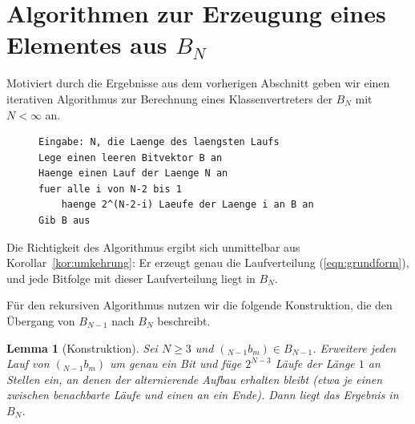 \documentclass[11pt,a4paper]{scrartcl}
\theoremstyle{plain}
\newtheorem{lemma}[satz]{Lemma}
\theoremstyle{definition}
\theoremstyle{remark}
\begin{document}
\section{Algorithmen zur Erzeugung eines Elementes aus
\texorpdfstring{$B_N$}{B\_N}}\label{sec:algorithmen}

\noindent Motiviert durch die Ergebnisse aus dem vorherigen Abschnitt
geben wir einen iterativen Algorithmus zur Berechnung eines
Klassenvertreters der $B_N$ mit $N<\infty$ an.

\begin{figure}[htbp]
\begin{lstlisting}[caption={Iterative Erzeugung einer Folge aus B\_N fuer ein beliebiges N},label={algo:iterativ}]
Eingabe: N, die Laenge des laengsten Laufs
Lege einen leeren Bitvektor B an
Haenge einen Lauf der Laenge N an
fuer alle i von N-2 bis 1
    haenge 2^(N-2-i) Laeufe der Laenge i an B an
Gib B aus
\end{lstlisting}
\end{figure}

\noindent Die Richtigkeit des Algorithmus ergibt sich unmittelbar aus
Korollar~\ref{kor:umkehrung}: Er erzeugt genau die Laufverteilung
(\ref{eqn:grundform}), und jede Bitfolge mit dieser Laufverteilung
liegt in $B_N$.

\noindent Für den rekursiven Algorithmus nutzen wir die folgende
Konstruktion, die den Übergang von $B_{N-1}$ nach $B_N$ beschreibt.

\begin{lemma}[Konstruktion]\label{lem:konstruktion}
Sei $N\geq 3$ und $({}_{N-1}b_m)\in B_{N-1}$. Erweitere jeden Lauf von
$({}_{N-1}b_m)$ um genau ein Bit und füge $2^{N-3}$ Läufe der Länge $1$
an Stellen ein, an denen der alternierende Aufbau erhalten bleibt (etwa
je einen zwischen benachbarte Läufe und einen an ein Ende). Dann liegt
das Ergebnis in $B_N$.
\end{lemma}
\end{document}
